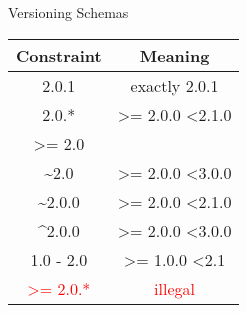 \begin{frame}{Versioning Schemas}
  \begin{table}
  	\begin{tabular}{|c|c|}
  		\toprule
  		Constraint & Meaning\\
  		\midrule
  		2.0.1 & exactly 2.0.1 \\
  		2.0.* & \textgreater= 2.0.0 \textless2.1.0\\
  		\textgreater= 2.0 &  \\
  		\~{}2.0 & \textgreater= 2.0.0 \textless3.0.0 \\
  		\~{}2.0.0 & \textgreater= 2.0.0 \textless2.1.0 \\
  		\^{}2.0.0 & \textgreater= 2.0.0 \textless3.0.0 \\
  		1.0 - 2.0 & \textgreater= 1.0.0 \textless2.1 \\
  		\textcolor{red}{\textgreater= 2.0.*} & \textcolor{red}{illegal} \\
  		\bottomrule
  	\end{tabular}
  \end{table}
\end{frame}